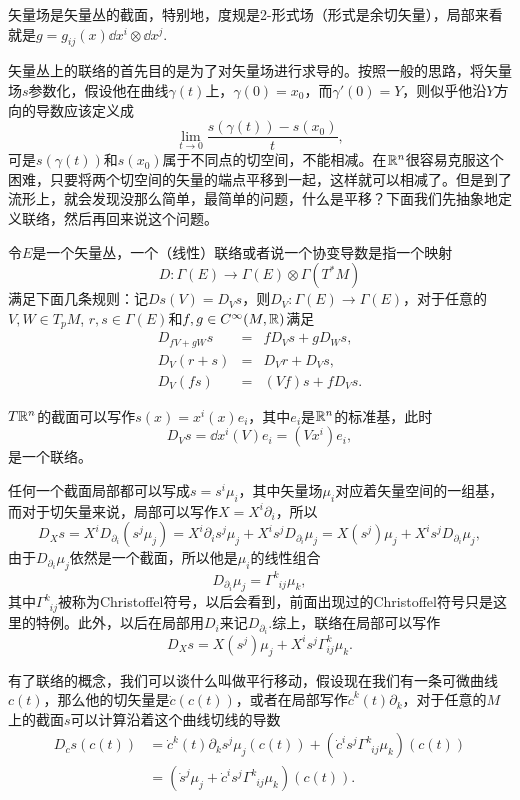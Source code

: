 矢量场是矢量丛的截面，特别地，度规是2-形式场（形式是余切矢量），局部来看就是$g=g_{ij}(x)\dd x^i\otimes \dd x^j$.

矢量丛上的联络的首先目的是为了对矢量场进行求导的。按照一般的思路，将矢量场$s$参数化，假设他在曲线$\gamma(t)$上，$\gamma(0)=x_0$，而$\gamma'(0)=Y$，则似乎他沿$Y$方向的导数应该定义成
\[
	\lim_{t\to 0}\frac{s(\gamma(t))-s(x_0)}{t},
\]
可是$s(\gamma(t))$和$s(x_0)$属于不同点的切空间，不能相减。在$\mathbb{R}^n$很容易克服这个困难，只要将两个切空间的矢量的端点平移到一起，这样就可以相减了。但是到了流形上，就会发现没那么简单，最简单的问题，什么是平移？下面我们先抽象地定义联络，然后再回来说这个问题。

\para 令$E$是一个矢量丛，一个（线性）联络或者说一个协变导数是指一个映射
\[
	D:\Gamma (E)\to\Gamma(E)\otimes \Gamma(T^*M)
\]
满足下面几条规则：记$Ds(V)=D_Vs$，则$D_V:\Gamma (E)\to\Gamma(E)$，对于任意的$V,W\in T_p M$, $r,s\in \Gamma (E)$和$f,g\in C^\infty(M,\mathbb{R})$满足
\[
\begin{array}{lcl} 
	D_{fV+gW}s &=& fD_Vs+gD_W s,\\
	D_V(r+s)   &=& D_Vr+D_Vs,\\
	D_V(fs)    &=& (Vf)s+fD_Vs.
\end{array}
\]

$T\mathbb{R}^n$的截面可以写作$s(x)=x^i(x)e_i$，其中$e_i$是$\mathbb{R}^n$的标准基，此时
\[
	D_Vs=\dd x^i(V) e_i=(Vx^i)e_i,
\]
是一个联络。

任何一个截面局部都可以写成$s=s^i\mu_i$，其中矢量场$\mu_i$对应着矢量空间的一组基，而对于切矢量来说，局部可以写作$X=X^i\partial_i$，所以
\[
	D_Xs=X^iD_{\partial_i}(s^j\mu_j)=X^i\partial_i s^j\mu_j+X^is^jD_{\partial_i}\mu_j=X(s^j)\mu_j+X^is^jD_{\partial_i}\mu_j,
\]
由于$D_{\partial_i}\mu_j$依然是一个截面，所以他是$\mu_i$的线性组合
\[
	D_{\partial_i}\mu_j=\Gamma^k_{\phantom{k}ij}\mu_k,
\]
其中$\Gamma^k_{\phantom{k}ij}$被称为Christoffel符号，以后会看到，前面出现过的Christoffel符号只是这里的特例。此外，以后在局部用$D_i$来记$D_{\partial_i}$.综上，联络在局部可以写作
\[
	D_Xs=X(s^j)\mu_j+X^is^j\Gamma^{k}_{ij}\mu_k.
\]

有了联络的概念，我们可以谈什么叫做平行移动，假设现在我们有一条可微曲线$c(t)$，那么他的切矢量是$\dot{c}(c(t))$，或者在局部写作$\dot{c}^k(t)\partial_k$，对于任意的$M$上的截面$s$可以计算沿着这个曲线切线的导数
\begin{align*}
	D_{\dot{c}}s(c(t))&=\dot{c}^k(t)\partial_ks^j\mu_j(c(t))+(\dot{c}^i s^j\Gamma^k_{\phantom{k}ij}\mu_k)(c(t))\\
	&=\left(\dot{s}^j\mu_j+\dot{c}^i s^j\Gamma^k_{\phantom{k}ij}\mu_k\right)(c(t)).
\end{align*}

